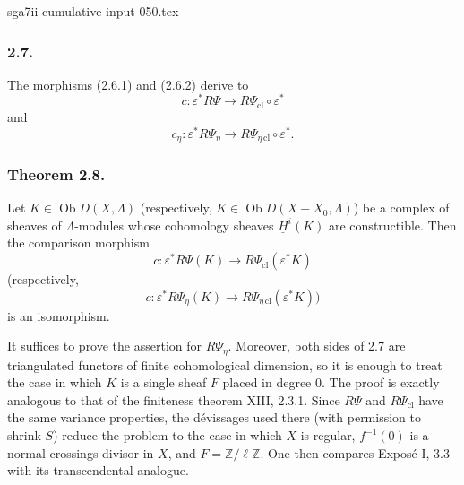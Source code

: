 \begin{filecontents*}{sga7ii-cumulative-input-050.tex}
\subsubsection*{2.7.}
The morphisms (2.6.1) and (2.6.2) derive to
\[
c:\varepsilon^*R\Psi
\longrightarrow R\Psi_{\mathrm{cl}}\circ\varepsilon^*
\]
and
\[
c_\eta:\varepsilon^*R\Psi_\eta
\longrightarrow R\Psi_{\eta\,\mathrm{cl}}\circ\varepsilon^*.
\]

\subsubsection*{Theorem 2.8.}
Let $K\in\operatorname{Ob}D(X,\Lambda)$ (respectively,
$K\in\operatorname{Ob}D(X-X_0,\Lambda)$) be a complex of sheaves of
$\Lambda$-modules whose cohomology sheaves $\underline H^i(K)$ are
constructible.  Then the comparison morphism
\[
c:\varepsilon^*R\Psi(K)
\longrightarrow R\Psi_{\mathrm{cl}}(\varepsilon^*K)
\]
(respectively,
\[
c:\varepsilon^*R\Psi_\eta(K)
\longrightarrow R\Psi_{\eta\,\mathrm{cl}}(\varepsilon^*K))
\]
is an isomorphism.

It suffices to prove the assertion for $R\Psi_\eta$.  Moreover, both
sides of 2.7 are triangulated functors of finite cohomological
dimension, so it is enough to treat the case in which $K$ is a single
sheaf $F$ placed in degree $0$.  The proof is exactly analogous to
that of the finiteness theorem XIII, 2.3.1.  Since $R\Psi$ and
$R\Psi_{\mathrm{cl}}$ have the same variance properties, the
d\'evissages used there (with permission to shrink $S$) reduce the
problem to the case in which $X$ is regular, $f^{-1}(0)$ is a normal
crossings divisor in $X$, and $F=\mathbb Z/\ell\mathbb Z$.  One then
compares Expos\'e I, 3.3 with its transcendental analogue.

\end{filecontents*}
